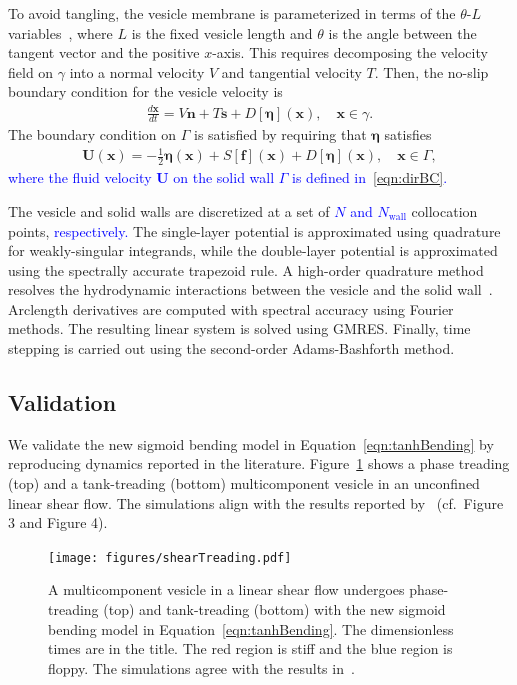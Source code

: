 \documentclass[twoside,twocolumn,9pt]{article}
\newcommand{\ff}{\mathbf{f}}
\newcommand{\eeta}{\boldsymbol{\eta}}
\newcommand{\nn}{\mathbf{n}}
\renewcommand{\ss}{\mathbf{s}}
\newcommand{\UU}{\mathbf{U}}
\newcommand{\xx}{\mathbf{x}}
\begin{document}
To avoid tangling, the vesicle membrane is parameterized in terms of the
$\theta$-$L$ variables~\cite{hou-low-she1994}, where $L$ is the fixed
vesicle length and $\theta$ is the angle between the tangent vector and
the positive $x$-axis. This requires decomposing the velocity field on
$\gamma$ into a normal velocity $V$ and tangential velocity $T$. Then,
the no-slip boundary condition for the vesicle velocity is
\begin{align}
  \frac{d\xx}{dt} = V \nn + T \ss + D[\eeta](\xx), \quad \xx \in \gamma.
\end{align}
The boundary condition on $\Gamma$ is satisfied by requiring that
$\eeta$ satisfies
\begin{align}
  \UU(\xx) = -\frac{1}{2}\eeta(\xx) + 
    S[\ff](\xx) + D[\eeta](\xx), \quad \xx \in \Gamma,
  \label{eqn:DLP_BIE}
\end{align}
\textcolor{blue}{
where the fluid velocity $\UU$ on the solid wall $\Gamma$ is defined
in~\eqref{eqn:dirBC}.}

The vesicle and solid walls are discretized at a set of 
\textcolor{blue}{
$N$ and $N_{\mathrm{wall}}$
}
collocation points,
\textcolor{blue}{
respectively.}
The single-layer potential is approximated using quadrature for
weakly-singular integrands, while the double-layer potential is
approximated using the spectrally accurate trapezoid rule. A high-order
quadrature method resolves the hydrodynamic interactions between the
vesicle and the solid wall~\cite{qua-bir2014}. Arclength derivatives are
computed with spectral accuracy using Fourier methods. The resulting
linear system is solved using GMRES. Finally, time stepping is carried
out using the second-order Adams-Bashforth method. 


\subsection{Validation}
\label{sec:validation}
We validate the new sigmoid bending model in
Equation~\eqref{eqn:tanhBending} by reproducing dynamics reported in the
literature. Figure~\ref{fig:treading} shows a phase treading (top) and a
tank-treading (bottom) multicomponent vesicle in an unconfined linear
shear flow. The simulations align with the results reported
by~\citet{liu-mar-li-vee-low2017} (cf.~Figure 3 and Figure 4).
\begin{figure}[h]
  \centering
  \texttt{[image: figures/shearTreading.pdf]}
  \caption{\label{fig:treading} \small A multicomponent vesicle in a
  linear shear flow undergoes phase-treading (top) and tank-treading
  (bottom) with the new sigmoid bending model in
  Equation~\eqref{eqn:tanhBending}. The dimensionless times are in the
  title. The red region is stiff and the blue region is floppy. The
  simulations agree with the results
  in~\citet{liu-mar-li-vee-low2017}.}
\end{figure}
\end{document}
